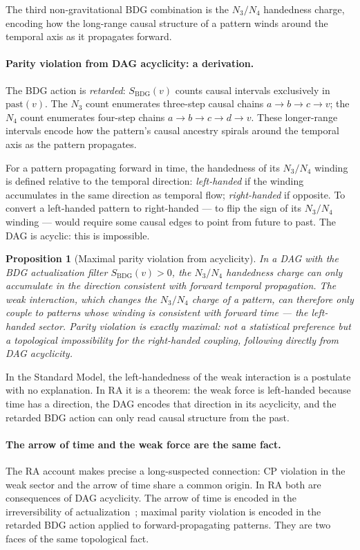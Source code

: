 \documentclass[11pt,a4paper]{article}
\newtheorem{proposition}[theorem]{Proposition}
\newcommand{\SBDG}{S_{\mathrm{BDG}}}
\begin{document}
The third non-gravitational BDG combination is the $N_3/N_4$ handedness
charge, encoding how the long-range causal structure of a pattern winds
around the temporal axis as it propagates forward.

\paragraph{Parity violation from DAG acyclicity: a derivation.}
The BDG action is \emph{retarded}: $\SBDG(v)$ counts causal intervals
exclusively in $\mathrm{past}(v)$. The $N_3$ count enumerates three-step
causal chains $a \to b \to c \to v$; the $N_4$ count enumerates four-step
chains $a \to b \to c \to d \to v$. These longer-range intervals encode how
the pattern's causal ancestry spirals around the temporal axis as the pattern
propagates.

For a pattern propagating forward in time, the handedness of its $N_3/N_4$
winding is defined relative to the temporal direction: \emph{left-handed} if
the winding accumulates in the same direction as temporal flow;
\emph{right-handed} if opposite. To convert a left-handed pattern to
right-handed --- to flip the sign of its $N_3/N_4$ winding --- would require
some causal edges to point from future to past. The DAG is acyclic: this is
impossible.

\begin{proposition}[Maximal parity violation from acyclicity]
\label{prop:chirality}
In a DAG with the BDG actualization filter $\SBDG(v) > 0$, the $N_3/N_4$
handedness charge can only accumulate in the direction consistent with forward
temporal propagation. The weak interaction, which changes the $N_3/N_4$
charge of a pattern, can therefore only couple to patterns whose winding is
consistent with forward time --- the left-handed sector. Parity violation is
exactly maximal: not a statistical preference but a topological impossibility
for the right-handed coupling, following directly from DAG acyclicity.
\end{proposition}

In the Standard Model, the left-handedness of the weak interaction is a
postulate with no explanation. In RA it is a theorem: the weak force is
left-handed because time has a direction, the DAG encodes that direction
in its acyclicity, and the retarded BDG action can only read causal structure
from the past.

\paragraph{The arrow of time and the weak force are the same fact.}
The RA account makes precise a long-suspected connection: CP violation in the
weak sector and the arrow of time share a common origin. In RA both are
consequences of DAG acyclicity. The arrow of time is encoded in the
irreversibility of actualization~\citep{Sandeman2026RAGC}; maximal parity
violation is encoded in the retarded BDG action applied to
forward-propagating patterns. They are two faces of the same topological fact.
\end{document}
